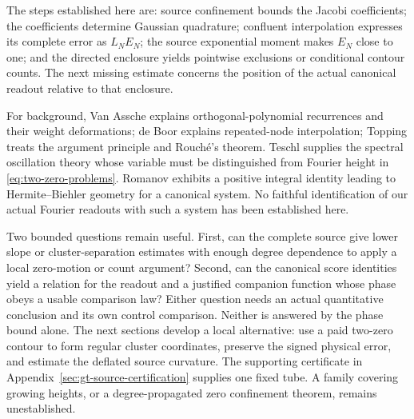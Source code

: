 The steps established here are: source confinement bounds the
Jacobi coefficients; the coefficients determine Gaussian quadrature;
confluent interpolation expresses its complete error as
\(L_NE_N\); the source exponential moment makes \(E_N\) close to one;
and the directed enclosure yields pointwise exclusions or conditional
contour counts. The next missing estimate concerns the position of
the actual canonical readout relative to that enclosure.

For background, Van Assche \cite[\S1.1 and \S2.3]{vanassche}
explains orthogonal-polynomial recurrences and their weight
deformations; de Boor \cite[\S7 and \S9]{deboor} explains repeated-node
interpolation; Topping \cite[\S9.8--9.9]{topping} treats the argument
principle and Rouch\'e's theorem. Teschl
\cite[\S4.1]{teschl} supplies the spectral oscillation theory whose
variable must be distinguished from Fourier height in
\eqref{eq:two-zero-problems}. Romanov
\cite[\S3.2, Proposition~4]{romanov} exhibits a positive integral
identity leading to Hermite--Biehler geometry for a canonical
system. No faithful identification of our actual Fourier readouts
with such a system has been established here.

Two bounded questions remain useful. First, can the complete
source give lower slope or cluster-separation estimates with
enough degree dependence to apply a local zero-motion or count
argument? Second, can the canonical score identities yield a
relation for the readout and a justified companion function whose
phase obeys a usable comparison law? Either question needs an
actual quantitative conclusion and its own control comparison.
Neither is answered by the phase bound alone. The next sections
develop a local alternative: use a paid two-zero contour to form regular
cluster coordinates, preserve the signed physical error, and estimate
the deflated source curvature. The supporting certificate in
Appendix~\ref{sec:gt-source-certification} supplies one fixed tube.
A family covering growing heights, or a degree-propagated zero
confinement theorem, remains unestablished.
